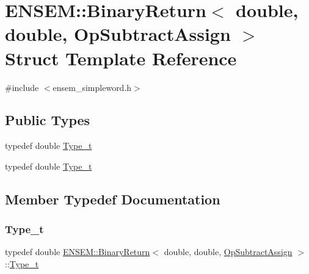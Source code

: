 \hypertarget{structENSEM_1_1BinaryReturn_3_01double_00_01double_00_01OpSubtractAssign_01_4}{}\section{E\+N\+S\+EM\+:\+:Binary\+Return$<$ double, double, Op\+Subtract\+Assign $>$ Struct Template Reference}
\label{structENSEM_1_1BinaryReturn_3_01double_00_01double_00_01OpSubtractAssign_01_4}


{\ttfamily \#include $<$ensem\+\_\+simpleword.\+h$>$}

\subsection*{Public Types}
\begin{DoxyCompactItemize}
\item 
typedef double \mbox{\hyperlink{structENSEM_1_1BinaryReturn_3_01double_00_01double_00_01OpSubtractAssign_01_4_ace697e1191a85ef3c635e6d0d147e1b3}{Type\+\_\+t}}
\item 
typedef double \mbox{\hyperlink{structENSEM_1_1BinaryReturn_3_01double_00_01double_00_01OpSubtractAssign_01_4_ace697e1191a85ef3c635e6d0d147e1b3}{Type\+\_\+t}}
\end{DoxyCompactItemize}


\subsection{Member Typedef Documentation}
\mbox{\label{structENSEM_1_1BinaryReturn_3_01double_00_01double_00_01OpSubtractAssign_01_4_ace697e1191a85ef3c635e6d0d147e1b3}} 
\subsubsection{\texorpdfstring{Type\_t}{Type\_t}\hspace{0.1cm}{\footnotesize\ttfamily [1/2]}}
{\footnotesize\ttfamily typedef double \mbox{\hyperlink{structENSEM_1_1BinaryReturn}{E\+N\+S\+E\+M\+::\+Binary\+Return}}$<$ double, double, \mbox{\hyperlink{structENSEM_1_1OpSubtractAssign}{Op\+Subtract\+Assign}} $>$\+::\mbox{\hyperlink{structENSEM_1_1BinaryReturn_3_01double_00_01double_00_01OpSubtractAssign_01_4_ace697e1191a85ef3c635e6d0d147e1b3}{Type\+\_\+t}}}

